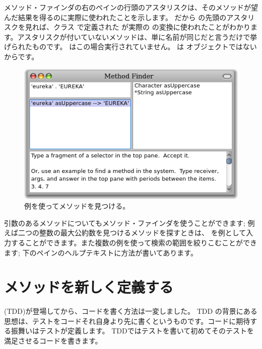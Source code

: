 \documentclass[a4paper,10pt,twoside]{book}
\begin{document}
メソッド・ファインダの右のペインの行頭のアスタリスクは、そのメソッドが望んだ結果を得るのに実際に使われたことを示します。
だから  の先頭のアスタリスクを見れば、クラス  で定義された  が実際の  の変換に使われたことがわかります。アスタリスクが付いていないメソッドは、単に名前が同じだと言うだけで挙げられたものです。 はこの場合実行されていません。 は  オブジェクトではないからです。

\begin{figure}[hbt]
\centerline {\includegraphics[width=\textwidth]{MethodFinder-example1}}
\caption{例を使ってメソッドを見つける。
}
\end{figure}

引数のあるメソッドについてもメソッド・ファインダを使うことができます; 例えば二つの整数の最大公約数を見つけるメソッドを探すときは、 を例として入力することができます。また複数の例を使って検索の範囲を絞りこむことができます; 下のペインのヘルプテキストに方法が書いてあります。

\section{メソッドを新しく定義する}

\cite{Beck03a} (TDD)が登場してから、コードを書く方法は一変しました。
TDD の背景にある思想は、テストをコードそれ自身より先に書くというものです。コードに期待する振舞いはテストが定義します。
TDDではテストを書いて初めてそのテストを満足させるコードを書きます。
\end{document}
